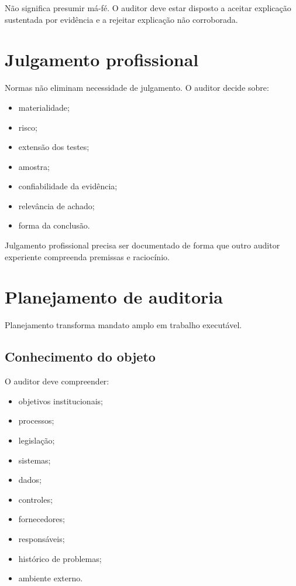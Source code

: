 Não significa presumir má-fé. O auditor deve estar disposto a aceitar explicação sustentada por evidência e a rejeitar explicação não corroborada.

\section{Julgamento profissional}

Normas não eliminam necessidade de julgamento. O auditor decide sobre:
\begin{itemize}
\item materialidade;
\item risco;
\item extensão dos testes;
\item amostra;
\item confiabilidade da evidência;
\item relevância de achado;
\item forma da conclusão.
\end{itemize}

Julgamento profissional precisa ser documentado de forma que outro auditor experiente compreenda premissas e raciocínio.

\section{Planejamento de auditoria}

Planejamento transforma mandato amplo em trabalho executável.

\subsection{Conhecimento do objeto}

O auditor deve compreender:
\begin{itemize}
\item objetivos institucionais;
\item processos;
\item legislação;
\item sistemas;
\item dados;
\item controles;
\item fornecedores;
\item responsáveis;
\item histórico de problemas;
\item ambiente externo.
\end{itemize}

